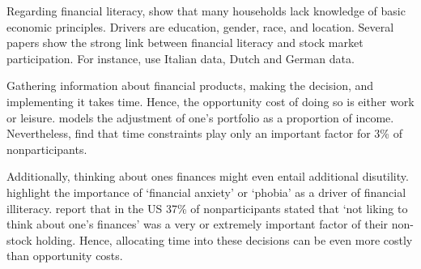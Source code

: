 \documentclass[ProjectABM]{subfiles}
\begin{document}
Regarding financial literacy, \cite{lusardi_mitchell_2011financial_literacy} show that many households lack knowledge of basic economic principles. Drivers are education, gender, race, and location. %
Several papers show the strong link between financial literacy and stock market participation. For instance, \cite{guiso_japelli_2002household_book} use Italian data, \cite{hochguertel_et_al_2002household,vanrooij_et_al_2011} Dutch and \cite{borsch_eymann_2000household} German data.

Gathering information about financial products, making the decision, and implementing it takes time. Hence, the opportunity cost of doing so is either work or leisure. \cite{bonaparte_et_al_2012adjustment} models the adjustment of one's portfolio as a proportion of income. Nevertheless, \cite{choi_2020} find that time constraints play only an important factor for 3\% of nonparticipants. %

Additionally, thinking about ones finances might even entail additional disutility. \cite{shapiro_burchell_2012} highlight the importance of `financial anxiety' or `phobia' as a driver of financial illiteracy. \cite{choi_2020} report that in the US 37\% of nonparticipants stated that `not liking to think about one's finances' was a very or extremely important factor of their non-stock holding. Hence, allocating time into these decisions can be even more costly than opportunity costs.
\end{document}
